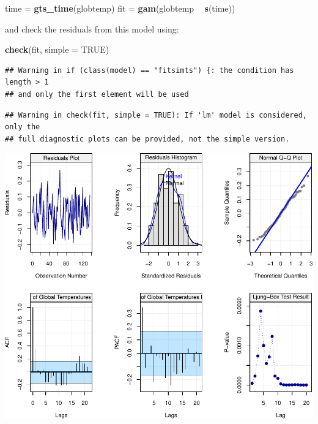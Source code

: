 \documentclass[]{book}
\newenvironment{Shaded}{\begin{snugshade}}{\end{snugshade}}
\newcommand{\DataTypeTok}[1]{\textcolor[rgb]{0.13,0.29,0.53}{#1}}
\newcommand{\KeywordTok}[1]{\textcolor[rgb]{0.13,0.29,0.53}{\textbf{#1}}}
\newcommand{\NormalTok}[1]{#1}
\newcommand{\OperatorTok}[1]{\textcolor[rgb]{0.81,0.36,0.00}{\textbf{#1}}}
\newcommand{\OtherTok}[1]{\textcolor[rgb]{0.56,0.35,0.01}{#1}}
\newcommand{\StringTok}[1]{\textcolor[rgb]{0.31,0.60,0.02}{#1}}
\theoremstyle{definition}
\theoremstyle{definition}
\theoremstyle{definition}
\theoremstyle{remark}
\begin{document}
\begin{Shaded}
\begin{Highlighting}[]
\NormalTok{time =}\StringTok{ }\KeywordTok{gts_time}\NormalTok{(globtemp)}
\NormalTok{fit =}\StringTok{ }\KeywordTok{gam}\NormalTok{(globtemp }\OperatorTok{~}\StringTok{ }\KeywordTok{s}\NormalTok{(time))}
\end{Highlighting}
\end{Shaded}

and check the residuals from this model using:

\begin{Shaded}
\begin{Highlighting}[]
\KeywordTok{check}\NormalTok{(fit, }\DataTypeTok{simple =} \OtherTok{TRUE}\NormalTok{)}
\end{Highlighting}
\end{Shaded}

\begin{verbatim}
## Warning in if (class(model) == "fitsimts") {: the condition has length > 1
## and only the first element will be used
\end{verbatim}

\begin{verbatim}
## Warning in check(fit, simple = TRUE): If 'lm' model is considered, only the
## full diagnostic plots can be provided, not the simple version.
\end{verbatim}

\begin{center}\includegraphics{ts_files/figure-latex/gamresid-1} \end{center}
\end{document}
